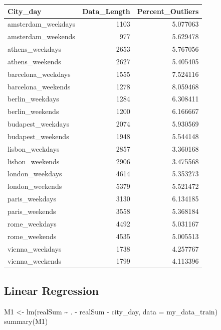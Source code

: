 \documentclass[
]{article}
\newenvironment{Shaded}{\begin{snugshade}}{\end{snugshade}}
\newcommand{\AttributeTok}[1]{\textcolor[rgb]{0.77,0.63,0.00}{#1}}
\newcommand{\FunctionTok}[1]{\textcolor[rgb]{0.00,0.00,0.00}{#1}}
\newcommand{\NormalTok}[1]{#1}
\newcommand{\OtherTok}[1]{\textcolor[rgb]{0.56,0.35,0.01}{#1}}
\newcommand{\SpecialCharTok}[1]{\textcolor[rgb]{0.00,0.00,0.00}{#1}}
\begin{document}
\begin{longtable}[]{@{}lrr@{}}
\toprule()
City\_day & Data\_Length & Percent\_Outliers \\
\midrule()
\endhead
amsterdam\_weekdays & 1103 & 5.077063 \\
amsterdam\_weekends & 977 & 5.629478 \\
athens\_weekdays & 2653 & 5.767056 \\
athens\_weekends & 2627 & 5.405405 \\
barcelona\_weekdays & 1555 & 7.524116 \\
barcelona\_weekends & 1278 & 8.059468 \\
berlin\_weekdays & 1284 & 6.308411 \\
berlin\_weekends & 1200 & 6.166667 \\
budapest\_weekdays & 2074 & 5.930569 \\
budapest\_weekends & 1948 & 5.544148 \\
lisbon\_weekdays & 2857 & 3.360168 \\
lisbon\_weekends & 2906 & 3.475568 \\
london\_weekdays & 4614 & 5.353273 \\
london\_weekends & 5379 & 5.521472 \\
paris\_weekdays & 3130 & 6.134185 \\
paris\_weekends & 3558 & 5.368184 \\
rome\_weekdays & 4492 & 5.031167 \\
rome\_weekends & 4535 & 5.005513 \\
vienna\_weekdays & 1738 & 4.257767 \\
vienna\_weekends & 1799 & 4.113396 \\
\bottomrule()
\end{longtable}

\hypertarget{linear-regression}{%
\subsection{Linear Regression}\label{linear-regression}}

\begin{Shaded}
\begin{Highlighting}[]
\NormalTok{M1 }\OtherTok{\textless{}{-}} \FunctionTok{lm}\NormalTok{(realSum }\SpecialCharTok{\textasciitilde{}}\NormalTok{ . }\SpecialCharTok{{-}}\NormalTok{ realSum }\SpecialCharTok{{-}}\NormalTok{ city\_day, }\AttributeTok{data =}\NormalTok{ my\_data\_train)}
\FunctionTok{summary}\NormalTok{(M1)}
\end{Highlighting}
\end{Shaded}
\end{document}
